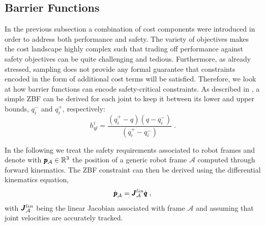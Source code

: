 
\subsection{Barrier Functions}
In the previous subsection a combination of cost components were introduced in order to address both performance and safety. The variety of objectives makes the cost landscape highly complex such that trading off performance against safety objectives can be quite challenging and tedious. Furthermore, as already stressed, sampling does not provide any formal guarantee that constraints encoded in the form of additional cost terms will be satisfied. Therefore, we look at how barrier functions can encode safety-critical constraints. As described in \cite{benzi2021optimization}, a simple ZBF can be derived for each joint to keep it between its lower and upper bounds, $q_i^-$ and $q_i^+$, respectively:
\begin{equation}
h_{ql}^i = \frac{(q_i^+ - q)(q - q_i^-)}{(q_i^+ - q_i^-)}\;.
\end{equation}

In the following we treat the safety requirements associated to robot frames and denote with $\pmb{p}_{\mathcal{A}} \in \mathbb{R}^{3}$ the position of a generic robot frame $\mathcal{A}$ computed through forward kinematics. The ZBF constraint can then be derived using the differential kinematics equation,
\begin{equation}
    \dot{\pmb{p}}_{\mathcal{A}} = \pmb{J}^{lin}_{\mathcal{A}} \dot{\pmb{q}}\;,
\end{equation}
with $\pmb{J}^{lin}_{\mathcal{A}}$ being the linear Jacobian associated with frame $\mathcal{A}$ and assuming that joint velocities are accurately tracked. 


